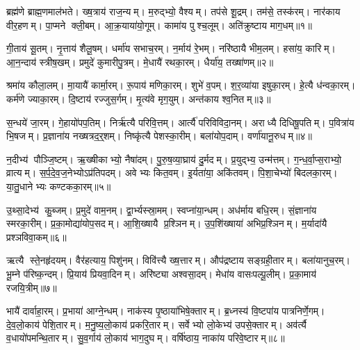 

\clearpage
{}
\setcounter{anuvakam}{0}
ब्रह्म॑णे ब्राह्म॒णमाल॑भते। ख्ष॒त्राय॑ राज॒न्यम्। म॒रुद्भ्यो॒ वैश्यम्। तप॑से शू॒द्रम्। तम॑से॒ तस्क॑रम्। नार॑काय वीर॒हणम्। पा॒प्मने क्ली॒बम्। आ॒क्र॒याया॑यो॒गूम्। कामा॑य पुश्च॒लूम्। अति॑क्रुष्टाय माग॒धम्॥१॥

गी॒ताय॑ सू॒तम्। नृ॒त्ताय॑ शैलू॒षम्। धर्मा॑य सभाच॒रम्। न॒र्माय॑ रे॒भम्। नरि॑ष्ठायै भीम॒लम्। हसा॑य॒ कारिम्। आ॒न॒न्दाय॑ स्त्रीष॒खम्। प्रमुदे॑ कुमारीपु॒त्रम्। मे॒धायै॑ रथका॒रम्। धैर्या॑य॒ तख्षा॑णम्॥२॥

श्रमा॑य कौला॒लम्। मा॒यायै॑ कार्मा॒रम्। रू॒पाय॑ मणिका॒रम्। शुभे॑ व॒पम्। श॒र॒व्या॑या इषुका॒रम्। हे॒त्यै ध॑न्वका॒रम्। कर्म॑णे ज्याका॒रम्। दि॒ष्टाय॑ रज्जुस॒र्गम्। मृ॒त्य॑वे मृग॒युम्। अन्त॑काय श्व॒नितम्॥३॥

स॒न्धये॑ जा॒रम्। गे॒हायो॑पप॒तिम्। निर्\mbox{}ऋ॑त्यै परिवि॒त्तम्। आर्त्यै॑ परिविविदा॒नम्। अराध्यै दिधिषू॒पतिम्। प॒वित्रा॑य भि॒षजम्। प्र॒ज्ञाना॑य नख्षत्रद॒र्॒शम्। निष्कृ॑त्यै पेशस्का॒रीम्। बला॑योप॒दाम्। वर्णा॑यानू॒रुधम्॥४॥

न॒दीभ्य॑ पौञ्जि॒ष्टम्। ऋ॒ख्षीकाभ्यो॒ नैषा॑दम्। पु॒रु॒ष॒व्या॒घ्राय॑ दु॒र्मदम्। प्र॒युद्भ्य॒ उन्म॑त्तम्। ग॒न्ध॒र्वा॒प्स॒राभ्यो॒ व्रात्यम्। स॒र्प॒दे॒व॒ज॒नेभ्योऽप्र॑तिपदम्। अवेभ्यः कित॒वम्। इ॒र्यता॑या॒ अकि॑तवम्। पि॒शा॒चेभ्यो॑ बिदलका॒रम्। या॒तु॒धानेभ्यः कण्टकका॒रम्॥५॥

उ॒थ्सा॒देभ्य॑ कु॒ब्जम्। प्र॒मुदे॑ वाम॒नम्। द्वा॒र्भ्यस्स्रा॒मम्। स्वप्ना॑या॒न्धम्। अध॑र्माय बधि॒रम्। सं॒ज्ञाना॑य स्मरका॒रीम्। प्र॒का॒मोद्या॑योप॒सदम्। आ॒शि॒ख्षायै प्र॒श्ञिनम्। उ॒प॒शि॑ख्षाया॑ अभिप्र॒श्ञिनम्। म॒र्यादा॑यै प्रश्ञविवा॒कम्॥६॥

ऋत्यै स्ते॒नहृ॑दयम्। वैर॑हत्याय॒ पिशु॑नम्। विवि॑त्त्यै ख्ष॒त्तारम्। औप॑द्रष्टाय सङ्ग्रही॒तारम्। बला॑यानुच॒रम्। भू॒म्ने प॑रिष्क॒न्दम्। प्रि॒याय॑ प्रियवा॒दिनम्। अरि॑ष्ट्या अश्वसा॒दम्। मेधा॑य वासःपल्पू॒लीम्। प्र॒का॒माय॑ रजयि॒त्रीम्॥७॥

भायै॑ दार्वाहा॒रम्। प्र॒भाया॑ आग्ने॒न्धम्। नाक॑स्य पृ॒ष्ठाया॑भिषे॒क्तारम्। ब्र॒ध्नस्य॑ वि॒ष्टपा॑य पात्रनिर्णे॒गम्। दे॒व॒लो॒काय॑ पेशि॒तारम्। म॒नु॒ष्य॒लो॒काय॑ प्रकरि॒तारम्। सर्वेभ्यो लो॒केभ्य॑ उपसे॒क्तारम्। अव॑र्त्यै व॒धायो॑पमन्थि॒तारम्। सु॒व॒र्गाय॑ लो॒काय॑ भाग॒दुघम्। वर्\mbox{}षि॑ष्ठाय॒ नाका॑य परिवे॒ष्टारम्॥८॥

